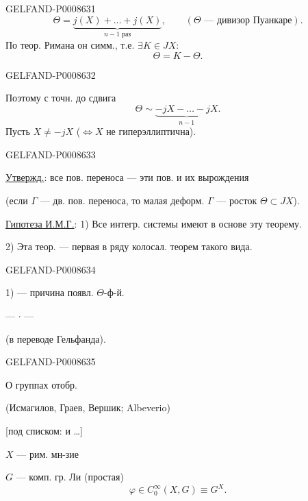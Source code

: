 \begin{GelfandAdjacentEvidence}{GELFAND-P000863}{1}
\[
\Theta=\underbrace{j(X)+\ldots+j(X)}_{n-1\text{ раз}},
\qquad (\Theta\text{ — дивизор Пуанкаре}).
\]
По теор. Римана он симм., т.е. \(\exists K\in JX\):
\[
\Theta=K-\Theta.
\]
\end{GelfandAdjacentEvidence}
\begin{GelfandAdjacentEvidence}{GELFAND-P000863}{2}


Поэтому с точн. до сдвига
\[
\Theta\sim\underbrace{-jX-\ldots-jX}_{n-1}.
\]
Пусть \(X\ne-jX\) (\(\Leftrightarrow X\) не гиперэллиптична).
\end{GelfandAdjacentEvidence}
\begin{GelfandAdjacentEvidence}{GELFAND-P000863}{3}


\uline{Утвержд.}: все пов. переноса — эти пов. и их вырождения

(если \(\Gamma\) — дв. пов. переноса, то малая деформ. \(\Gamma\) — росток \(\Theta\subset JX\)).

\uline{Гипотеза И.М.Г.}: 1) Все интегр. системы имеют в основе эту теорему.

2) Эта теор. — первая в ряду колосал. теорем такого вида.
\end{GelfandAdjacentEvidence}
\begin{GelfandAdjacentEvidence}{GELFAND-P000863}{4}


1) — причина появл. \(\Theta\)-ф-й.
\begin{center}— \(\cdot\) —\end{center}

 \quad {} (в переводе Гельфанда).
\end{GelfandAdjacentEvidence}
\begin{GelfandAdjacentEvidence}{GELFAND-P000863}{5}


О группах отобр.

(Исмагилов, Граев, Вершик; Albeverio)

[под списком: и \ldots]

\(X\) — рим. мн-зие

\(G\) — комп. гр. Ли (простая)
\[
\varphi\in C_0^\infty(X,G)\equiv G^X.
\]
\end{GelfandAdjacentEvidence}
